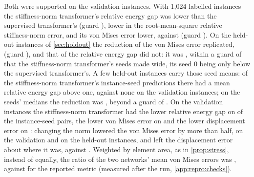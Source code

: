 Both were supported on the validation instances. With 1,024 labelled instances the
stiffness-norm transformer's relative energy gap was \numHTwoARel{} lower than the
supervised transformer's (guard \numHTwoATau{}), \numHTwoARootRel{} lower in the
root-mean-square relative stiffness-norm error, and its von Mises error \numHTwoBRel{}
lower, \numCmKnormVm{} against \numCmLabVm{} (guard \numHTwoBTau{}). On the held-out
instances of \cref{sec:holdout} the reduction of the von Mises error replicated,
\numHoldHTwoBRel{} (guard \numHoldHTwoBTau{}), and that of the relative energy gap did not:
it was \numHoldHTwoARel{}, within a guard of \numHoldHTwoATau{} that the stiffness-norm
transformer's seeds made wide, its seed 0 being only \numHoldHTwoASeedZero{} below the
supervised transformer's. A few held-out instances carry those seed means:
\numHoldTwoWorseInstKnorm{} of the stiffness-norm transformer's \numHoldTwoPairs{}
instance-seed predictions there had a mean relative energy gap above one, against none on
the validation instances; on the seeds' medians the reduction was \numHoldHTwoAMedRel{},
beyond a guard of \numHoldHTwoAMedTau{}. On the validation instances the stiffness-norm
transformer had the lower relative energy gap on \numPairCmKnormLabGap{} of the
instance-seed pairs, the lower von Mises error on \numPairCmKnormLabVm{} and the lower
displacement error on \numPairCmKnormLabDisp{}: changing the norm lowered the von Mises
error by more than half, on the validation and on the held-out instances, and left the
displacement error about where it was, \numCmKnormDisp{} against \numCmLabDisp{}. Weighted
by element area, as in \cref{prop:stress}, instead of equally, the ratio of the two
networks' mean von Mises errors was \numSpecVmAreaRatio{}, against \numSpecVmElemRatio{} for
the reported metric (measured after the run, \ref{app:repro:checks}).

